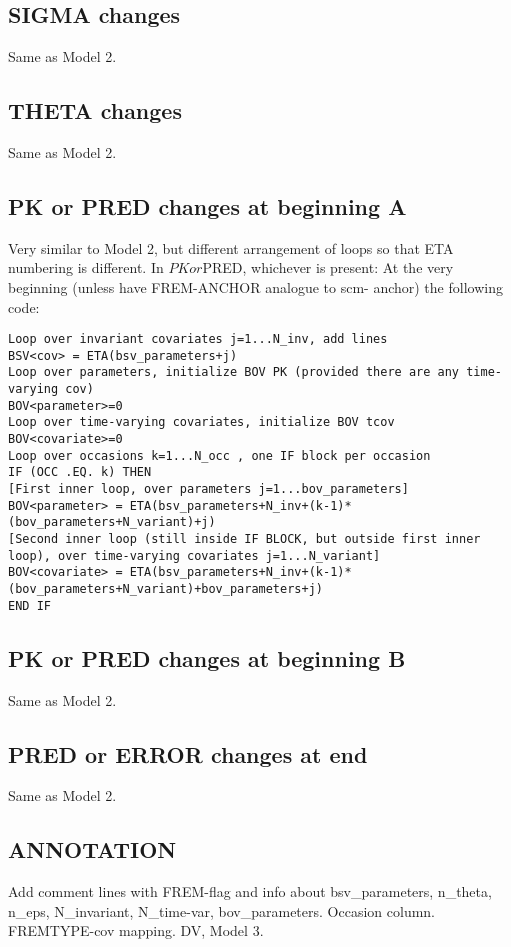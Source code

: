 \subsection{SIGMA changes}
Same as Model 2.

\subsection{THETA changes}
Same as Model 2.

\subsection{PK or PRED changes at beginning A}
Very similar to Model 2, but different arrangement of loops so that ETA numbering is different.
In $PK or $PRED, whichever is present:
At the very beginning (unless have FREM-ANCHOR analogue to scm- anchor) the following code: 
\begin{verbatim}
Loop over invariant covariates j=1...N_inv, add lines
BSV<cov> = ETA(bsv_parameters+j)
Loop over parameters, initialize BOV PK (provided there are any time-varying cov)
BOV<parameter>=0
Loop over time-varying covariates, initialize BOV tcov
BOV<covariate>=0
Loop over occasions k=1...N_occ , one IF block per occasion
IF (OCC .EQ. k) THEN
[First inner loop, over parameters j=1...bov_parameters]
BOV<parameter> = ETA(bsv_parameters+N_inv+(k-1)*(bov_parameters+N_variant)+j)
[Second inner loop (still inside IF BLOCK, but outside first inner loop), over time-varying covariates j=1...N_variant]
BOV<covariate> = ETA(bsv_parameters+N_inv+(k-1)*(bov_parameters+N_variant)+bov_parameters+j)
END IF
\end{verbatim}

\subsection{PK or PRED changes at beginning B}
Same as Model 2.

\subsection{PRED or ERROR changes at end}
Same as Model 2.

\subsection{ANNOTATION}
Add comment lines with FREM-flag and info about bsv\_parameters, n\_theta, n\_eps, N\_invariant, N\_time-var, bov\_parameters. Occasion column. FREMTYPE-cov mapping. DV, Model 3.


